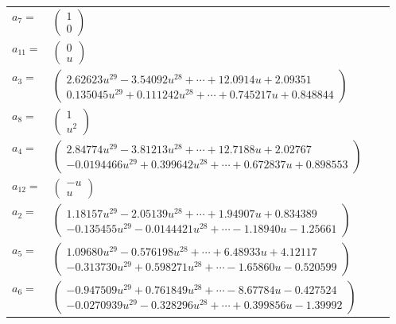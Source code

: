 \documentclass[1p]{elsarticle_modified}
\theoremstyle{definition}
\begin{document}
\begin{tabular}{m{7pt} m{180pt} m{7pt} m{180pt} }
\flushright $a_{7}=$&$\begin{pmatrix}1\\0\end{pmatrix}$ \\
\flushright $a_{11}=$&$\begin{pmatrix}0\\u\end{pmatrix}$ \\
\flushright $a_{3}=$&$\begin{pmatrix}2.62623 u^{29}-3.54092 u^{28}+\cdots+12.0914 u+2.09351\\0.135045 u^{29}+0.111242 u^{28}+\cdots+0.745217 u+0.848844\end{pmatrix}$ \\
\flushright $a_{8}=$&$\begin{pmatrix}1\\u^2\end{pmatrix}$ \\
\flushright $a_{4}=$&$\begin{pmatrix}2.84774 u^{29}-3.81213 u^{28}+\cdots+12.7188 u+2.02767\\-0.0194466 u^{29}+0.399642 u^{28}+\cdots+0.672837 u+0.898553\end{pmatrix}$ \\
\flushright $a_{12}=$&$\begin{pmatrix}- u\\u\end{pmatrix}$ \\
\flushright $a_{2}=$&$\begin{pmatrix}1.18157 u^{29}-2.05139 u^{28}+\cdots+1.94907 u+0.834389\\-0.135455 u^{29}-0.0144421 u^{28}+\cdots-1.18940 u-1.25661\end{pmatrix}$ \\
\flushright $a_{5}=$&$\begin{pmatrix}1.09680 u^{29}-0.576198 u^{28}+\cdots+6.48933 u+4.12117\\-0.313730 u^{29}+0.598271 u^{28}+\cdots-1.65860 u-0.520599\end{pmatrix}$ \\
\flushright $a_{6}=$&$\begin{pmatrix}-0.947509 u^{29}+0.761849 u^{28}+\cdots-8.67784 u-0.427524\\-0.0270939 u^{29}-0.328296 u^{28}+\cdots+0.399856 u-1.39992\end{pmatrix}$ \\

\end{tabular}
\end{document}

